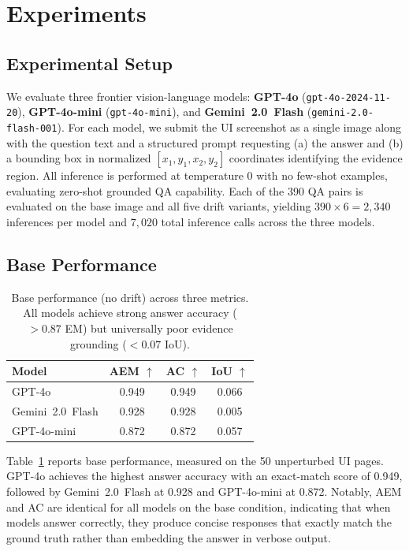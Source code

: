 \section{Experiments}
\label{sec:experiments}

\subsection{Experimental Setup}
\label{sec:exp:setup}

We evaluate three frontier vision-language models: \textbf{GPT-4o} (\texttt{gpt-4o-2024-11-20}), \textbf{GPT-4o-mini} (\texttt{gpt-4o-mini}), and \textbf{Gemini~2.0~Flash} (\texttt{gemini-2.0-flash-001}). For each model, we submit the UI screenshot as a single image along with the question text and a structured prompt requesting (a) the answer and (b) a bounding box in normalized $[x_1, y_1, x_2, y_2]$ coordinates identifying the evidence region. All inference is performed at temperature 0 with no few-shot examples, evaluating zero-shot grounded QA capability. Each of the 390 QA pairs is evaluated on the base image and all five drift variants, yielding $390 \times 6 = 2{,}340$ inferences per model and $7{,}020$ total inference calls across the three models.

\subsection{Base Performance}
\label{sec:exp:base}

\begin{table}[t]
\centering
\caption{Base performance (no drift) across three metrics. All models achieve strong answer accuracy ($>0.87$ EM) but universally poor evidence grounding ($<0.07$ IoU).}
\label{tab:base}
\small
\begin{tabular}{lccc}
\toprule
\textbf{Model} & \textbf{AEM} $\uparrow$ & \textbf{AC} $\uparrow$ & \textbf{IoU} $\uparrow$ \\
\midrule
GPT-4o & 0.949 & 0.949 & 0.066 \\
Gemini~2.0~Flash & 0.928 & 0.928 & 0.005 \\
GPT-4o-mini & 0.872 & 0.872 & 0.057 \\
\bottomrule
\end{tabular}
\end{table}

Table~\ref{tab:base} reports base performance, measured on the 50 unperturbed UI pages. GPT-4o achieves the highest answer accuracy with an exact-match score of 0.949, followed by Gemini~2.0~Flash at 0.928 and GPT-4o-mini at 0.872. Notably, AEM and AC are identical for all models on the base condition, indicating that when models answer correctly, they produce concise responses that exactly match the ground truth rather than embedding the answer in verbose output.

